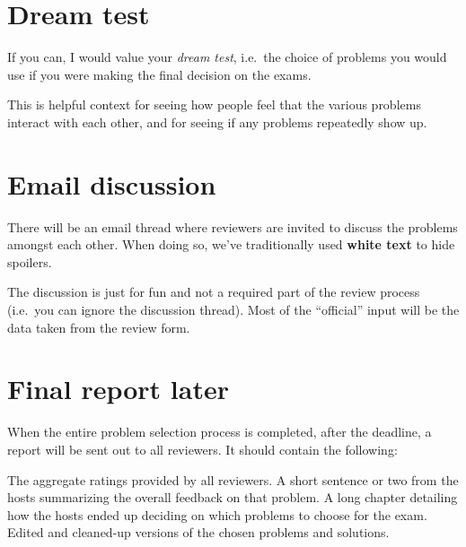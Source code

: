 \section{Dream test}
If you can, I would value your \emph{dream test},
i.e.\ the choice of problems you would use
if you were making the final decision on the exams.

This is helpful context for seeing how people
feel that the various problems interact with each other,
and for seeing if any problems repeatedly show up.

\section{Email discussion}
There will be an email thread where reviewers
are invited to discuss the problems amongst each other.
When doing so, we've traditionally used \textbf{white text}
to hide spoilers.

The discussion is just for fun and not a required part
of the review process (i.e.\ you can ignore the discussion thread).
Most of the ``official'' input will be the data
taken from the review form.

\section{Final report later}
When the entire problem selection process is completed,
after the deadline, a report will be sent out to all reviewers.
It should contain the following:
\begin{itemize}
	\ii The aggregate ratings provided by all reviewers.
	\ii A short sentence or two from the hosts
	summarizing the overall feedback on that problem.
	\ii A long chapter detailing how the hosts ended up
	deciding on which problems to choose for the exam.
	\ii Edited and cleaned-up versions of the
	chosen problems and solutions.
\end{itemize}

